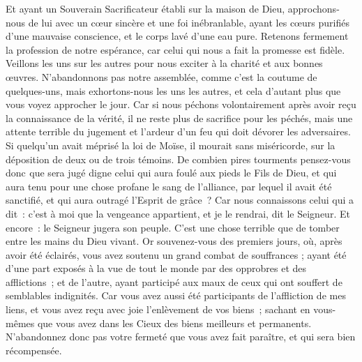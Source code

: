 \begin{multicols}{2}
Et ayant un Souverain Sacrificateur établi sur la maison de Dieu,
approchons-nous de lui avec un cœur sincère et une foi inébranlable, ayant les cœurs purifiés d’une mauvaise conscience, et le corps lavé d’une eau pure.
Retenons fermement la profession de notre espérance, car celui qui nous a fait la promesse est fidèle.
Veillons les uns sur les autres pour nous exciter à la charité et aux bonnes œuvres.
N’abandonnons pas notre assemblée, comme c’est la coutume de quelques-uns, mais exhortons-nous les uns les autres, et cela d'autant plus que vous voyez approcher le jour.
Car si nous péchons volontairement après avoir reçu la connaissance de la vérité, il ne reste plus de sacrifice pour les péchés,
mais une attente terrible du jugement et l'ardeur d'un feu qui doit dévorer les adversaires.
Si quelqu'un avait méprisé la loi de Moïse, il mourait sans miséricorde, sur la déposition de deux ou de trois témoins.
De combien pires tourments pensez-vous donc  que sera jugé digne celui qui aura foulé aux pieds le Fils de Dieu, et qui aura tenu pour une chose profane le sang de l’alliance, par lequel il avait été sanctifié, et qui aura outragé l’Esprit de grâce ?
Car nous connaissons celui qui a dit : c’est à moi que la vengeance appartient, et je le rendrai, dit le Seigneur. Et encore : le Seigneur jugera son peuple.
C'est une chose terrible que de tomber entre les mains du Dieu vivant.
Or souvenez-vous des premiers jours, où, après avoir été éclairés, vous avez soutenu un grand combat de souffrances ;
ayant été d’une part exposés à la vue de tout le monde par des opprobres et des afflictions ; et de l’autre, ayant participé aux maux de ceux qui ont souffert de semblables indignités.
Car vous avez aussi été participants de l’affliction de mes liens, et vous avez reçu avec joie l’enlèvement de vos biens ; sachant en vous-mêmes que vous avez dans les Cieux des biens meilleurs et permanents.
N'abandonnez donc pas votre fermeté que vous avez fait paraître, et qui sera bien récompensée.

\end{multicols}
